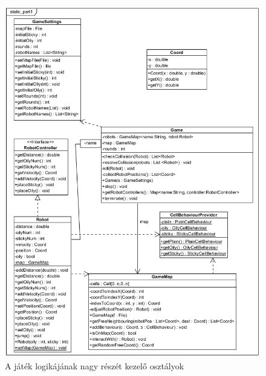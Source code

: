 \begin{figure}[!htbp]
\begin{center}
	\includegraphics[width=\textwidth, center]{./chapters/chapter03/static1.png}
	\caption{A játék logikájának nagy részét kezelő osztályok}
\end{center}
\end{figure}

